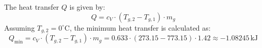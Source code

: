 The heat transfer \( Q \) is given by:  
\[
Q = c_V \cdot (T_{g,2} - T_{g,1}) \cdot m_g
\]  
Assuming \( T_{g,2} = 0^\circ\text{C} \), the minimum heat transfer is calculated as:  
\[
Q_{\text{min}} = c_V \cdot (T_{g,2} - T_{g,1}) \cdot m_g = 0.633 \cdot (273.15 - 773.15) \cdot 1.42 \approx -1.08245 \, \text{kJ}
\]